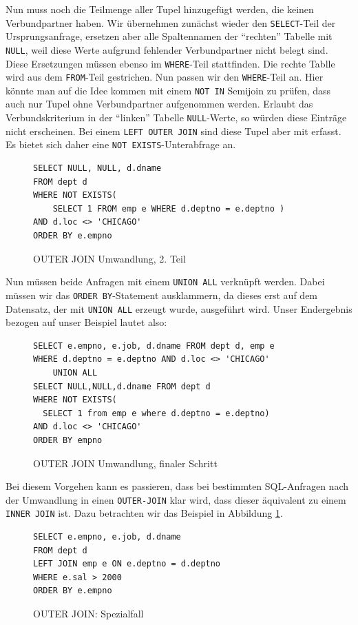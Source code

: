 Nun muss noch die Teilmenge aller Tupel hinzugefügt werden, die keinen Verbundpartner haben. Wir übernehmen zunächst wieder den \verb|SELECT|-Teil der Ursprungsanfrage, ersetzen aber alle Spaltennamen der ``rechten'' Tabelle mit \verb|NULL|, weil diese Werte aufgrund fehlender Verbundpartner nicht belegt sind. Diese Ersetzungen müssen ebenso im \verb|WHERE|-Teil stattfinden. Die rechte Tablle wird aus dem \verb|FROM|-Teil gestrichen. Nun passen wir den \verb|WHERE|-Teil an. Hier könnte man auf die Idee kommen mit einem \verb|NOT IN| Semijoin zu prüfen, dass auch nur Tupel ohne Verbundpartner aufgenommen werden. Erlaubt  das Verbundskriterium in der ``linken'' Tabelle \verb|NULL|-Werte, so würden diese Einträge nicht erscheinen. Bei einem \verb|LEFT OUTER JOIN| sind diese Tupel aber mit erfasst. Es bietet sich daher eine \verb|NOT EXISTS|-Unterabfrage an. 

\begin{figure}[H]
\begin{verbatim}
SELECT NULL, NULL, d.dname
FROM dept d 
WHERE NOT EXISTS(
    SELECT 1 FROM emp e WHERE d.deptno = e.deptno )
AND d.loc <> 'CHICAGO'
ORDER BY e.empno
\end{verbatim}
\caption{OUTER JOIN Umwandlung, 2. Teil}
\end{figure}

Nun müssen beide Anfragen mit einem \verb|UNION ALL| verknüpft werden. Dabei müssen wir das \verb|ORDER BY|-Statement ausklammern, da dieses erst auf dem Datensatz, der mit \verb|UNION ALL| erzeugt wurde, ausgeführt wird. Unser Endergebnis bezogen auf unser Beispiel lautet also:

\begin{figure}[H]
\begin{verbatim}
SELECT e.empno, e.job, d.dname FROM dept d, emp e
WHERE d.deptno = e.deptno AND d.loc <> 'CHICAGO'
    UNION ALL
SELECT NULL,NULL,d.dname FROM dept d 
WHERE NOT EXISTS(
  SELECT 1 from emp e where d.deptno = e.deptno)
AND d.loc <> 'CHICAGO'
ORDER BY empno
\end{verbatim}
\caption{OUTER JOIN Umwandlung, finaler Schritt}
\end{figure}

Bei diesem Vorgehen kann es passieren, dass bei bestimmten SQL-Anfragen nach der Umwandlung in einen \verb|OUTER-JOIN| klar wird, dass dieser äquivalent zu einem \verb|INNER JOIN| ist. Dazu betrachten wir das Beispiel in Abbildung \ref{fig:outer_s1}.

\begin{figure}[H]
\begin{verbatim}
SELECT e.empno, e.job, d.dname 
FROM dept d 
LEFT JOIN emp e ON e.deptno = d.deptno 
WHERE e.sal > 2000
ORDER BY e.empno
\end{verbatim}
\caption{OUTER JOIN: Spezialfall}
\label{fig:outer_s1}
\end{figure}

